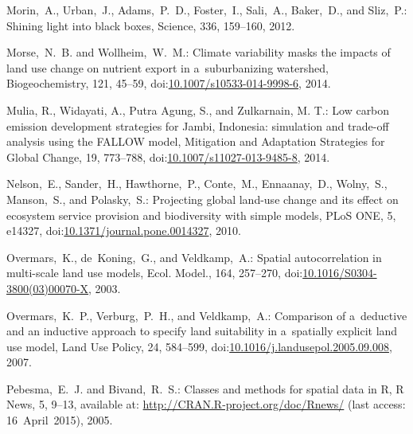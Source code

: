 \documentclass[gmdd, online, hvmath]{copernicus}
\begin{document}
\begin{thebibliography}{97}
   Morin,~A., Urban,~J., Adams,~P.~D.,
    Foster,~I., Sali,~A., Baker,~D., and Sliz,~P.: Shining light into
    black boxes, Science, 336, 159--160, 2012.


   Morse,~N.~B. and
    Wollheim,~W.~M.: Climate variability masks the impacts of land use
    change on nutrient export in a~suburbanizing watershed,
    Biogeochemistry, 121, 45--59,
doi:\href{http://dx.doi.org/10.1007/s10533-014-9998-6}{10.1007/s10533-014-9998-6},
    2014.


   Mulia, R., Widayati, A., Putra Agung, S., and Zulkarnain, M. T.: Low carbon emission development
    strategies for Jambi, Indonesia: simulation and trade-off analysis
    using the {FALLOW} model, Mitigation and Adaptation Strategies for
    Global Change, 19,
    773--788,
doi:\href{http://dx.doi.org/10.1007/s11027-013-9485-8}{10.1007/s11027-013-9485-8}, 2014.


   Nelson,~E.,
    Sander,~H., Hawthorne,~P., Conte,~M., Ennaanay,~D., Wolny,~S.,
    Manson,~S., and Polasky,~S.: Projecting global land-use change and
    its effect on ecosystem service provision and biodiversity with
    simple models, {PLoS} {ONE}, 5, e14327,
    doi:\href{http://dx.doi.org/10.1371/journal.pone.0014327}{10.1371/journal.pone.0014327}, 2010.


   Overmars,~K., de~Koning,~G., and
    Veldkamp,~A.: Spatial autocorrelation in multi-scale land use
    models, Ecol. Model., 164, 257--270,
    doi:\href{http://dx.doi.org/10.1016/S0304-3800(03)00070-X}{10.1016/S0304-3800(03)00070-X}, 2003.


   Overmars,~K.~P., Verburg,~P.~H., and
    Veldkamp,~A.: Comparison of a~deductive and an inductive approach
    to specify land suitability in a~spatially explicit land use
    model, Land Use Policy, 24, 584--599,
    doi:\href{http://dx.doi.org/10.1016/j.landusepol.2005.09.008}{10.1016/j.landusepol.2005.09.008}, 2007. %




   Pebesma,~E.~J. and
    Bivand,~R.~S.: Classes and methods for spatial data in {R}, R
    News, 5, 9--13, available at:
    \url{http://CRAN.R-project.org/doc/Rnews/} (last access: 16~April~2015), 2005.


\end{thebibliography}
\end{document}
